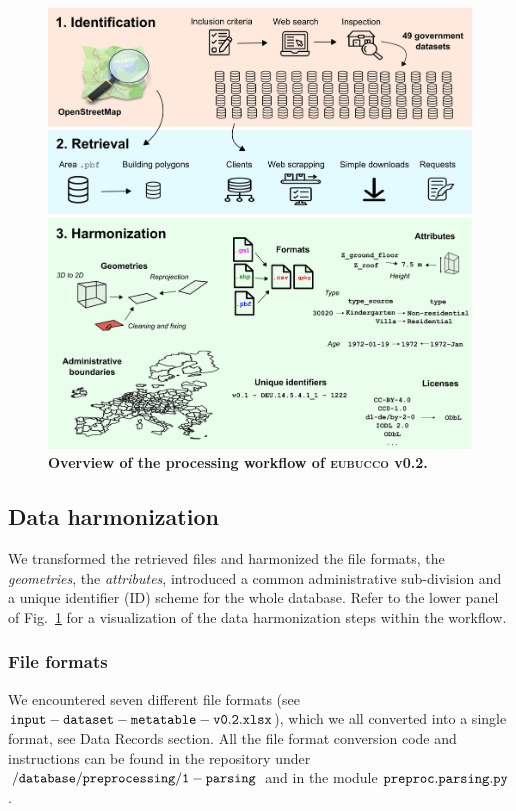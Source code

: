 \documentclass[fleqn,10pt]{wlscirep}
\begin{document}
\begin{figure}[h!]
\centering
\includegraphics[width=\linewidth]{figs/methods_no_valid.png}
\caption{\textbf{Overview of the processing workflow of \textsc{eubucco} v0.2.}}
\label{fig:methods}
\end{figure}

\subsection*{Data harmonization}

We transformed the retrieved files and harmonized the file formats, the \textit{geometries}, the \textit{attributes}, introduced a common administrative sub-division and a unique identifier (ID) scheme for the whole database.  Refer to the lower panel of Fig.~\ref{fig:methods} for a visualization of the data harmonization steps within the workflow.

\subsubsection*{File formats}

We encountered seven different file formats (see ${\tt input-dataset-metatable-v0.2.xlsx}$), which we all converted into a single format, see Data Records section. All the file format conversion code and instructions can be found in the repository under $\tt{/database/preprocessing/1-parsing}$ and in the module $\tt{preproc.parsing.py}$ \cite{eubucco-0.2-code2022}. 
\end{document}
